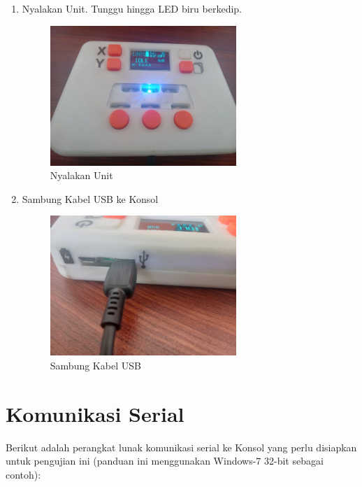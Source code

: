 \documentclass[12pt]{book}
\begin{document}
\begin{enumerate}
		\newpage
		\item Nyalakan Unit. Tunggu hingga LED biru berkedip.
		\begin{figure}[!ht]
			\centering
			\includegraphics[width=200pt]{images/pasang/nyalakan_unit}
			\caption{Nyalakan Unit}
		\end{figure}
		\item Sambung Kabel USB ke Konsol
		\begin{figure}[!ht]
			\centering
			\includegraphics[width=200pt]{images/pasang/sambung_usb}
			\caption{Sambung Kabel USB}
		\end{figure}
	\end{enumerate}

    \section{Komunikasi Serial}

    Berikut adalah perangkat lunak komunikasi serial ke Konsol yang perlu disiapkan untuk pengujian ini
    (panduan ini menggunakan Windows-7 32-bit sebagai contoh):
\end{document}
